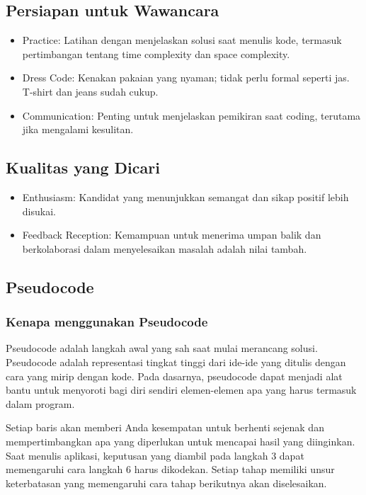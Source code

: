 \documentclass{article}
\begin{document}
\subsection{Persiapan untuk Wawancara}
\begin{itemize}
    \item Practice: Latihan dengan menjelaskan solusi saat menulis kode, termasuk pertimbangan tentang time complexity dan space complexity.
    \item Dress Code: Kenakan pakaian yang nyaman; tidak perlu formal seperti jas. T-shirt dan jeans sudah cukup.
    \item Communication: Penting untuk menjelaskan pemikiran saat coding, terutama jika mengalami kesulitan.
\end{itemize}

\subsection{Kualitas yang Dicari}
\begin{itemize}
    \item Enthusiasm: Kandidat yang menunjukkan semangat dan sikap positif lebih disukai.
    \item Feedback Reception: Kemampuan untuk menerima umpan balik dan berkolaborasi dalam menyelesaikan masalah adalah nilai tambah.
\end{itemize}

\subsection{Pseudocode}
\subsubsection{Kenapa menggunakan Pseudocode}
Pseudocode adalah langkah awal yang sah saat mulai merancang solusi. Pseudocode adalah representasi tingkat tinggi dari ide-ide yang ditulis dengan cara yang mirip dengan kode. Pada dasarnya, pseudocode dapat menjadi alat bantu untuk menyoroti bagi diri sendiri elemen-elemen apa yang harus termasuk dalam program.

Setiap baris akan memberi Anda kesempatan untuk berhenti sejenak dan mempertimbangkan apa yang diperlukan untuk mencapai hasil yang diinginkan. Saat menulis aplikasi, keputusan yang diambil pada langkah 3 dapat memengaruhi cara langkah 6 harus dikodekan. Setiap tahap memiliki unsur keterbatasan yang memengaruhi cara tahap berikutnya akan diselesaikan.
\end{document}
